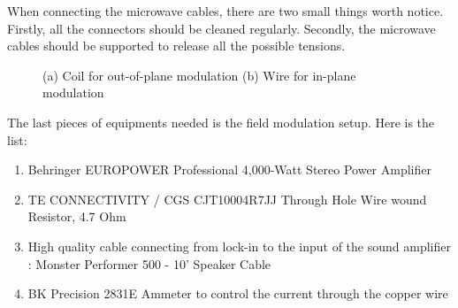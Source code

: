 When connecting the microwave cables, there are two small things worth notice. Firstly, all the connectors should be cleaned regularly. Secondly, the microwave cables should be supported to release all the possible tensions.

\begin{figure}[t]
\centering
{}
\caption{(a) Coil for out-of-plane modulation (b) Wire for in-plane modulation}
\end{figure}

The last pieces of equipments needed is the field modulation setup. Here is the list:

\begin{enumerate}
  \item Behringer EUROPOWER Professional 4,000-Watt Stereo Power Amplifier 
  \item TE CONNECTIVITY / CGS CJT10004R7JJ  Through Hole Wire wound Resistor, 4.7 Ohm
  \item High quality cable connecting from lock-in to the input of the sound amplifier : Monster Performer 500 - 10' Speaker Cable
  \item BK Precision 2831E  Ammeter to control the current through the copper wire  
\end{enumerate}
  
